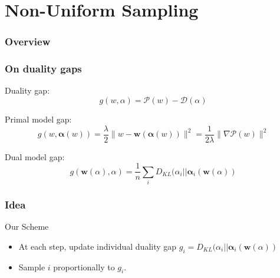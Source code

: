 \documentclass{beamer}
\DeclareMathOperator{\1}{\mathbb{1}}
\begin{document}
\section{Non-Uniform Sampling}
\begin{frame}
	\frametitle{Overview}
	\tableofcontents[currentsection] 
\end{frame}
\begin{frame}
	\frametitle{On duality gaps}
	Duality gap:
	\begin{equation*}
		g(w,\alpha) = \mathscr P(w) - \mathscr D(\alpha)
	\end{equation*}
	
	Primal model gap:
	\begin{equation*}
		\label{primal duality gap}
		g(w,\bm \alpha(w)) = \frac{\lambda}{2} \|w- \bm w(\bm \alpha(w))\|^2 = \frac{1}{2 \lambda} \|\nabla \mathscr P(w)\|^2
	\end{equation*}
	
	Dual model gap:
	\begin{equation*}
		g(\bm w(\alpha),\alpha) = \frac{1}{n} \sum_i D_{KL} (\alpha_i || \bm \alpha_i(\bm w(\alpha))
	\end{equation*}
	
\end{frame}
\begin{frame}
	\frametitle{Idea}
	
	\begin{block}{Our Scheme}
	\begin{itemize}
		\item At each step, update individual duality gap $ g_i = D_{KL} (\alpha_i || \bm \alpha_i(\bm w(\alpha))$
		\item Sample $i$ proportionally to $g_i$.
	\end{itemize}
	\end{block}
	
	
\end{frame}
\end{document}
